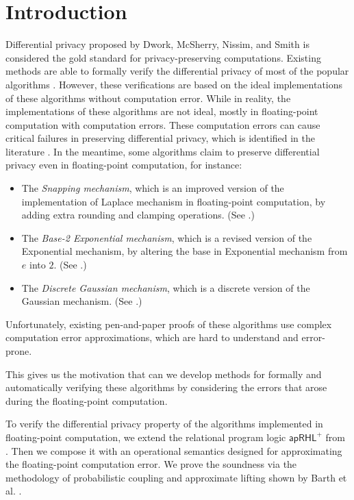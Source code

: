 \documentclass[a4paper,11pt]{article}
\begin{document}
\section{Introduction}
Differential privacy proposed by Dwork, McSherry, Nissim, and Smith \cite{dwork2006calibrating} is considered the gold standard for privacy-preserving computations. 
%
Existing methods are able to formally verify the differential privacy of most of the popular algorithms \cite{barthe2016proving}. 
However, these verifications are based on the ideal implementations of these algorithms without computation error.
While in reality, the implementations of these algorithms are not ideal, mostly in floating-point computation with computation errors.
These computation errors can cause critical failures in preserving differential privacy, which is identified in the literature \cite{balcer2017differential, gazeau2016preserving, mckenna2020permute, mironov2012significance, ilvento2020implementing}.
%
In the meantime, some algorithms claim to preserve differential privacy even in floating-point computation, for instance:
\begin{itemize}
	\item The \emph{Snapping mechanism}, which is an improved version of the implementation of Laplace mechanism in floating-point computation, by adding extra rounding and clamping operations. (See \cite{mironov2012significance}.)
%
	\item The \emph{Base-2 Exponential mechanism}, which is a revised version of the Exponential mechanism, by altering the base in Exponential mechanism from $e$ into $2$. (See \cite{ilvento2020implementing}.)
%
	\item The \emph{Discrete Gaussian mechanism}, which is a discrete version of the Gaussian mechanism. (See \cite{canonne2020discrete}.)
\end{itemize}
%
Unfortunately, existing pen-and-paper proofs of these algorithms use complex computation error approximations, which are hard to understand and error-prone.

This gives us the motivation that can we develop methods for formally and automatically verifying these algorithms by considering the errors that arose during the floating-point computation.

To verify the differential privacy property of
the algorithms implemented in floating-point computation,
we extend the relational program logic $\mathsf{apRHL}^+$ from
\cite{barthe2016proving}. 
Then we compose 
it with an operational semantics designed for approximating the floating-point computation error.
%
We prove the soundness via the methodology of probabilistic coupling and approximate lifting shown by Barth et al. \cite{barthe2016proving}.
%
\end{document}
